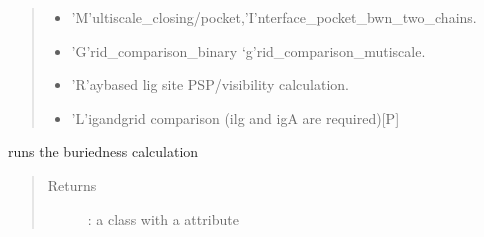 \documentclass[letterpaper,10pt,english]{sphinxmanual}
\begin{document}
\begin{fulllineitems}
\begin{fulllineitems}
\begin{quote}
\begin{description}
\begin{itemize}
\begin{itemize}
\item {} 
’M’ultiscale\_closing/pocket,’I’nterface\_pocket\_bwn\_two\_chains.

\item {} 
’G’rid\_comparison\_binary ‘g’rid\_comparison\_mutiscale.

\item {} 
’R’ay\sphinxhyphen{}based lig site PSP/visibility calculation.

\item {} 
’L’igand\sphinxhyphen{}grid comparison (\sphinxhyphen{}ilg and \sphinxhyphen{}igA are required){[}P{]}

\end{itemize}


\end{itemize}

\end{description}\end{quote}

\end{fulllineitems}


\begin{fulllineitems}
\label{\detokenize{calculation_api:hotspots.calculation.Buriedness.calculate}}
runs the buriedness calculation
\begin{quote}\begin{description}
\item[{Returns}] \leavevmode
{}: a class with a  attribute

\end{description}\end{quote}

\end{fulllineitems}


\end{fulllineitems}

\end{document}
